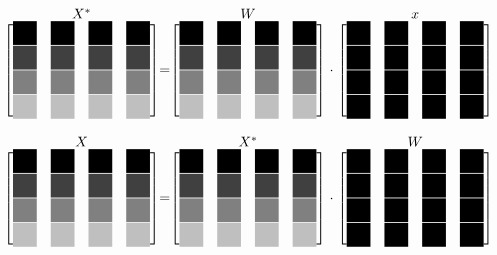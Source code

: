  \[
  \stackrel{\mbox{$X^*$}}{
   \begin{bmatrix}
    \myBlackBox 	& \myBlackBox 		& \myBlackBox 		& \myBlackBox \\
    \myDarkgrayBox 	& \myDarkgrayBox 	& \myDarkgrayBox 	& \myDarkgrayBox \\
    \myGrayBox 		& \myGrayBox 		& \myGrayBox 		& \myGrayBox \\
    \myLightgrayBox 	& \myLightgrayBox 	& \myLightgrayBox 	& \myLightgrayBox 
   \end{bmatrix}
  }
  =
  \stackrel{\mbox{$W$}}{
   \begin{bmatrix}
    \myBlackBox 	& \myBlackBox 		& \myBlackBox 		& \myBlackBox \\
    \myDarkgrayBox 	& \myDarkgrayBox 	& \myDarkgrayBox 	& \myDarkgrayBox \\
    \myGrayBox 		& \myGrayBox 		& \myGrayBox 		& \myGrayBox \\
    \myLightgrayBox 	& \myLightgrayBox 	& \myLightgrayBox 	& \myLightgrayBox 
   \end{bmatrix}
  }
  \cdot
  \stackrel{\mbox{$x$}}{
   \begin{bmatrix}
    \myBlackBox & \myBlackBox & \myBlackBox & \myBlackBox \\
    \myBlackBox & \myBlackBox & \myBlackBox & \myBlackBox \\
    \myBlackBox & \myBlackBox & \myBlackBox & \myBlackBox \\
    \myBlackBox & \myBlackBox & \myBlackBox & \myBlackBox 
   \end{bmatrix}
  }
 \]

 
 \[
  \stackrel{\mbox{$X$}}{
   \begin{bmatrix}
    \myBlackBox 	& \myBlackBox 		& \myBlackBox 		& \myBlackBox \\
    \myDarkgrayBox 	& \myDarkgrayBox 	& \myDarkgrayBox 	& \myDarkgrayBox \\
    \myGrayBox 		& \myGrayBox 		& \myGrayBox 		& \myGrayBox \\
    \myLightgrayBox 	& \myLightgrayBox 	& \myLightgrayBox 	& \myLightgrayBox 
   \end{bmatrix}
  }
  =
  \stackrel{\mbox{$X^*$}}{
   \begin{bmatrix}
    \myBlackBox 	& \myBlackBox 		& \myBlackBox 		& \myBlackBox \\
    \myDarkgrayBox 	& \myDarkgrayBox 	& \myDarkgrayBox 	& \myDarkgrayBox \\
    \myGrayBox 		& \myGrayBox 		& \myGrayBox 		& \myGrayBox \\
    \myLightgrayBox 	& \myLightgrayBox 	& \myLightgrayBox 	& \myLightgrayBox 
   \end{bmatrix}
  }
  \cdot
  \stackrel{\mbox{$W$}}{
   \begin{bmatrix}
    \myBlackBox & \myBlackBox & \myBlackBox & \myBlackBox \\
    \myBlackBox & \myBlackBox & \myBlackBox & \myBlackBox \\
    \myBlackBox & \myBlackBox & \myBlackBox & \myBlackBox \\
    \myBlackBox & \myBlackBox & \myBlackBox & \myBlackBox 
   \end{bmatrix}
  }
 \]
 

